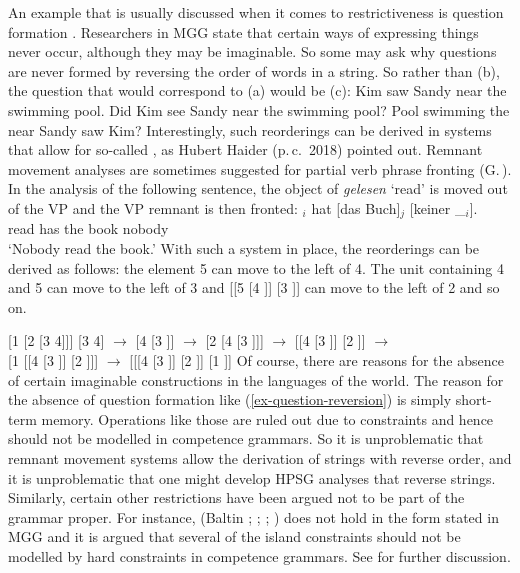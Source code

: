 \documentclass[output=paper
	        ,collection
	        ,collectionchapter
 	        ,biblatex
                ,babelshorthands
                ,newtxmath
                ,draftmode
                ,colorlinks, citecolor=brown
]{langscibook}
\begin{document}
An example that is usually discussed when it comes to restrictiveness is question
formation \citep{MMGRRBW2003a}. Researchers in MGG state that certain ways of expressing things never occur, although
they may be imaginable. So some may ask why questions are never formed by reversing the
order of words in a string. So rather than (b), the question that would correspond to
(a) would be (c):
\eal
\ex Kim saw Sandy near the swimming pool.
\ex Did Kim see Sandy near the swimming pool?
\ex\label{ex-question-reversion} 
Pool swimming the near Sandy saw Kim?
\zl
Interestingly, such reorderings can be derived in systems that allow for so-called
\emph{}, as Hubert Haider (p.\,c.\ 2018) pointed
out. Remnant movement analyses are sometimes suggested for partial verb phrase fronting
(G.\,\citealp{GMueller98a}). In the analysis of the following sentence, the object of \emph{gelesen}
`read' is moved out of the VP and the VP remnant is then fronted:
\ea
{}$_i$ hat [das Buch]$_j$ [keiner \_$_i$].\\
     {}        {}     read         has \spacebr{}the book \spacebr{}nobody\\
\glt `Nobody read the book.'
\z
\noindent
With such a system in place, the reorderings can be derived as follows: the element 5 can move to the left of 4. The unit containing 4 and 5 can move to the left of 3 and [[5 [4 \trace]] [3
    \trace]] can move to the left of 2 and so on.

\eal
\ex{} [1 [2 [3 4]]] 
\ex {} [3 4] $\to$ [4 [3 \trace]] $\to$ [2 [4 [3 \trace]]] $\to$ [[4 [3 \trace]] [2 \trace]] $\to$\\
    {} [1 [[4 [3 \trace]] [2 \trace]]] $\to$ [[[4 [3 \trace]] [2 \trace]] [1 \trace]]
\zl
Of course, there are reasons for the absence of certain imaginable constructions in the languages of
the world. The reason for the absence of question formation like (\ref{ex-question-reversion}) is
simply short-term memory. Operations like those are ruled out due to  constraints and
hence should not be modelled in competence grammars. So it is unproblematic that remnant movement
systems allow the derivation of strings with reverse order, and it is unproblematic that one might
develop HPSG analyses that reverse strings. Similarly, certain other restrictions have been argued
not to be part of the grammar proper. For instance,  (Baltin \citeyear[]{Baltin81a};
\citeyear{Baltin2006a}; \citealp[]{Rizzi82b}; \citealp[--40]{Chomsky86b}) does not hold in the form stated in
MGG \parencites{Mueller2004d}[Section~13.1.5]{MuellerGT-Eng1} and it is argued that several of the
island constraints should not be modelled by hard constraints in competence grammars. See
 for further discussion. 
\end{document}
